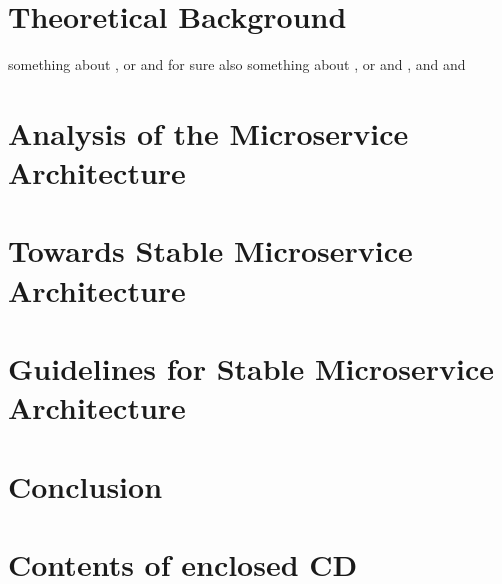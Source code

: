 \documentclass[thesis=M,english,hidelinks]{FITthesis}[2012/10/20]
\begin{document}
\chapter{Theoretical Background}
\label{sec:theoretical_background}
something about \cite{ns-towards-evolvable}, or \cite{ns-recreating} and for sure \cite{ns-toward-general-theory}
also something about \cite{ms-vs-soa}, or \cite{ms-who-is-using} and \cite{ms-goto-challenges-george}, and \cite{ms-building-ms} and \cite{ms-evolutionary-arch}
\cite{ms-design-tradeoffs}
\cite{ms-underestimated-network-impact}
\cite{ms-integrating-with-adaptable-ea}

\chapter{Analysis of the Microservice Architecture}
\label{sec:msa_analysis}

\chapter{Towards Stable Microservice Architecture}
\label{sec:msa_compliance}

\chapter{Guidelines for Stable Microservice Architecture}
\label{sec:guidelines}

\chapter{Conclusion}
\label{sec:conclusion}





\appendix

\printglossary[type=\acronymtype,toctitle=]

\chapter{Contents of enclosed CD}
\begin{figure}
\end{figure}
\end{document}
